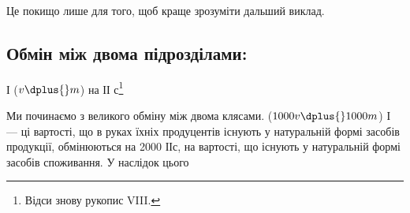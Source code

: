 Це покищо лише для того, щоб краще зрозуміти дальший виклад.

\subsection{Обмін між двома підрозділами:}

І ($v \dplus{} m$) на ІІ с\footnote{
Відси знову рукопис VIII.
}

Ми починаємо з великого обміну між двома клясами. ($1000v \dplus{}
1000m$) І — ці вартості, що в руках їхніх продуцентів існують у натуральній
формі засобів продукції, обмінюються на 2000 ІІс, на вартості,
що існують у натуральній формі засобів споживання. У наслідок цього
\parbreak{}  %
